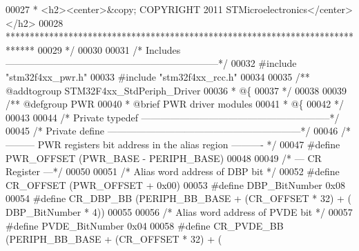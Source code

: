 \begin{DoxyCode}
00027 \textcolor{comment}{  * <h2><center>&copy; COPYRIGHT 2011 STMicroelectronics</center></h2>}
00028 \textcolor{comment}{  ******************************************************************************}
00029 \textcolor{comment}{  */}
00030 
00031 \textcolor{comment}{/* Includes ------------------------------------------------------------------*/}
00032 \textcolor{preprocessor}{#}\textcolor{preprocessor}{include} "stm32f4xx_pwr.h"
00033 \textcolor{preprocessor}{#}\textcolor{preprocessor}{include} "stm32f4xx_rcc.h"
00034 
00035 \textcolor{comment}{/** @addtogroup STM32F4xx\_StdPeriph\_Driver}
00036 \textcolor{comment}{  * @\{}
00037 \textcolor{comment}{  */}
00038 
00039 \textcolor{comment}{/** @defgroup PWR }
00040 \textcolor{comment}{  * @brief PWR driver modules}
00041 \textcolor{comment}{  * @\{}
00042 \textcolor{comment}{  */}
00043 
00044 \textcolor{comment}{/* Private typedef -----------------------------------------------------------*/}
00045 \textcolor{comment}{/* Private define ------------------------------------------------------------*/}
00046 \textcolor{comment}{/* --------- PWR registers bit address in the alias region ---------- */}
00047 \textcolor{preprocessor}{#}\textcolor{preprocessor}{define} \textcolor{preprocessor}{PWR\_OFFSET}               \textcolor{preprocessor}{(}PWR_BASE \textcolor{preprocessor}{-} PERIPH_BASE\textcolor{preprocessor}{)}
00048 
00049 \textcolor{comment}{/* --- CR Register ---*/}
00050 
00051 \textcolor{comment}{/* Alias word address of DBP bit */}
00052 \textcolor{preprocessor}{#}\textcolor{preprocessor}{define} \textcolor{preprocessor}{CR\_OFFSET}                \textcolor{preprocessor}{(}PWR_OFFSET \textcolor{preprocessor}{+} 0x00\textcolor{preprocessor}{)}
00053 \textcolor{preprocessor}{#}\textcolor{preprocessor}{define} \textcolor{preprocessor}{DBP\_BitNumber}            0x08
00054 \textcolor{preprocessor}{#}\textcolor{preprocessor}{define} \textcolor{preprocessor}{CR\_DBP\_BB}                \textcolor{preprocessor}{(}PERIPH_BB_BASE \textcolor{preprocessor}{+} \textcolor{preprocessor}{(}CR_OFFSET \textcolor{preprocessor}{*} 32\textcolor{preprocessor}{)} \textcolor{preprocessor}{+} \textcolor{preprocessor}{(}
      DBP_BitNumber \textcolor{preprocessor}{*} 4\textcolor{preprocessor}{)}\textcolor{preprocessor}{)}
00055 
00056 \textcolor{comment}{/* Alias word address of PVDE bit */}
00057 \textcolor{preprocessor}{#}\textcolor{preprocessor}{define} \textcolor{preprocessor}{PVDE\_BitNumber}           0x04
00058 \textcolor{preprocessor}{#}\textcolor{preprocessor}{define} \textcolor{preprocessor}{CR\_PVDE\_BB}               \textcolor{preprocessor}{(}PERIPH_BB_BASE \textcolor{preprocessor}{+} \textcolor{preprocessor}{(}CR_OFFSET \textcolor{preprocessor}{*} 32\textcolor{preprocessor}{)} \textcolor{preprocessor}{+} \textcolor{preprocessor}{(}

\end{DoxyCode}
